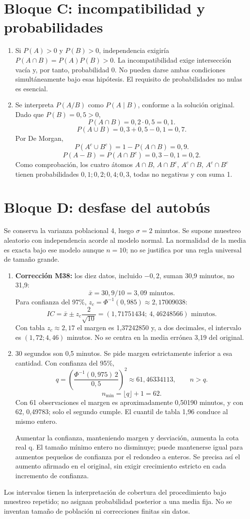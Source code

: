 \documentclass[11pt]{article}
\begin{document}
\section*{Bloque C: incompatibilidad y probabilidades}
\begin{enumerate}[label=(\alph*)]
\item Si $P(A)>0$ y $P(B)>0$, independencia exigiría $P(A\cap B)=P(A)P(B)>0$. La incompatibilidad exige intersección vacía y, por tanto, probabilidad 0. No pueden darse ambas condiciones simultáneamente bajo esas hipótesis. El requisito de probabilidades no nulas es esencial.
\item Se interpreta $P(A/B)$ como $P(A\mid B)$, conforme a la solución original. Dado que $P(B)=0,5>0$,
\[
P(A\cap B)=0,2\cdot0,5=\boxed{0,1}.
\]
\[
P(A\cup B)=0,3+0,5-0,1=\boxed{0,7}.
\]
Por De Morgan,
\[
P(A^c\cup B^c)=1-P(A\cap B)=\boxed{0,9}.
\]
\[
P(A-B)=P(A\cap B^c)=0,3-0,1=\boxed{0,2}.
\]
Como comprobación, los cuatro átomos $A\cap B$, $A\cap B^c$, $A^c\cap B$, $A^c\cap B^c$ tienen probabilidades $0,1;0,2;0,4;0,3$, todas no negativas y con suma 1.
\end{enumerate}
\clearpage
\section*{Bloque D: desfase del autobús}
Se conserva la varianza poblacional 4, luego $\sigma=2$ minutos. Se supone muestreo aleatorio con independencia acorde al modelo normal. La normalidad de la media es exacta bajo ese modelo aunque $n=10$; no se justifica por una regla universal de tamaño grande.
\begin{enumerate}[label=(\alph*)]
\item \textbf{Corrección M38:} los diez datos, incluido $-0,2$, suman 30,9 minutos, no 31,9:
\[
\bar x=30,9/10=\boxed{3,09\text{ minutos}}.
\]
Para confianza del 97\%, $z_c=\Phi^{-1}(0,985)\approx2,17009038$:
\[
IC=\bar x\pm z_c\frac2{\sqrt{10}}
=\boxed{(1,71751434;\ 4,46248566)}\text{ minutos}.
\]
Con tabla $z_c\approx2,17$ el margen es 1,37242850 y, a dos decimales, el intervalo es $(1,72;4,46)$ minutos. No se centra en la media errónea 3,19 del original.
\item 30 segundos son 0,5 minutos. Se pide margen estrictamente inferior a esa cantidad. Con confianza del 95\%,
\[
q=\left(\frac{\Phi^{-1}(0,975)\,2}{0,5}\right)^2\approx61,46334113,
\qquad n>q.
\]
\[
\boxed{n_{\min}=\lfloor q\rfloor+1=62}.
\]
Con 61 observaciones el margen es aproximadamente 0,50190 minutos, y con 62, 0,49783; solo el segundo cumple. El cuantil de tabla 1,96 conduce al mismo entero.

Aumentar la confianza, manteniendo margen y desviación, aumenta la cota real q. El tamaño mínimo entero no disminuye; puede mantenerse igual para aumentos pequeños de confianza por el redondeo a enteros. Se precisa así el aumento afirmado en el original, sin exigir crecimiento estricto en cada incremento de confianza.
\end{enumerate}
Los intervalos tienen la interpretación de cobertura del procedimiento bajo muestreo repetido; no asignan probabilidad posterior a una media fija. No se inventan tamaño de población ni correcciones finitas sin datos.
\end{document}
